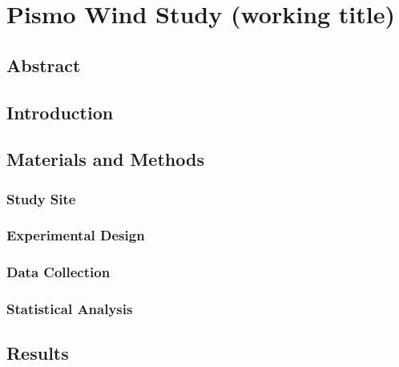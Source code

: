 \chapter{Pismo Wind Study (working title)}

\section{Abstract}

\section{Introduction}
\lipsum[1]  %

\section{Materials and Methods}
\subsection{Study Site}

\subsection{Experimental Design}

\subsection{Data Collection}

\subsection{Statistical Analysis}

\section{Results}
\lipsum[2]  %

